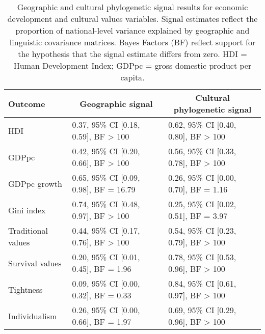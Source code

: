 \documentclass[
  man,floatsintext]{apa6}
\begin{document}
\begin{table}[H]

\begin{center}
\begin{threeparttable}

\caption{\label{tab:tableSignal}Geographic and cultural phylogenetic signal results for economic development and cultural values variables. Signal estimates reflect the proportion of national-level variance explained by geographic and linguistic covariance matrices. Bayes Factors (BF) reflect support for the hypothesis that the signal estimate differs from zero. HDI = Human Development Index; GDPpc = gross domestic product per capita.}

\small{

\begin{tabular}{lll}
\toprule
Outcome & \multicolumn{1}{c}{Geographic signal} & \multicolumn{1}{c}{Cultural phylogenetic signal}\\
\midrule
HDI & 0.37, 95\% CI [0.18, 0.59], BF > 100 & 0.62, 95\% CI [0.40, 0.80], BF > 100\\
GDPpc & 0.42, 95\% CI [0.20, 0.66], BF > 100 & 0.56, 95\% CI [0.33, 0.78], BF > 100\\
GDPpc growth & 0.65, 95\% CI [0.09, 0.98], BF = 16.79 & 0.26, 95\% CI [0.00, 0.70], BF = 1.16\\
Gini index & 0.74, 95\% CI [0.48, 0.97], BF > 100 & 0.25, 95\% CI [0.02, 0.51], BF = 3.97\\
Traditional values & 0.44, 95\% CI [0.17, 0.76], BF > 100 & 0.54, 95\% CI [0.23, 0.79], BF > 100\\
Survival values & 0.20, 95\% CI [0.01, 0.45], BF = 1.96 & 0.78, 95\% CI [0.53, 0.96], BF > 100\\
Tightness & 0.09, 95\% CI [0.00, 0.32], BF = 0.33 & 0.84, 95\% CI [0.61, 0.97], BF > 100\\
Individualism & 0.26, 95\% CI [0.00, 0.66], BF = 1.97 & 0.69, 95\% CI [0.29, 0.96], BF > 100\\
\bottomrule
\end{tabular}

}

\end{threeparttable}
\end{center}

\end{table}

\newpage
\end{document}
